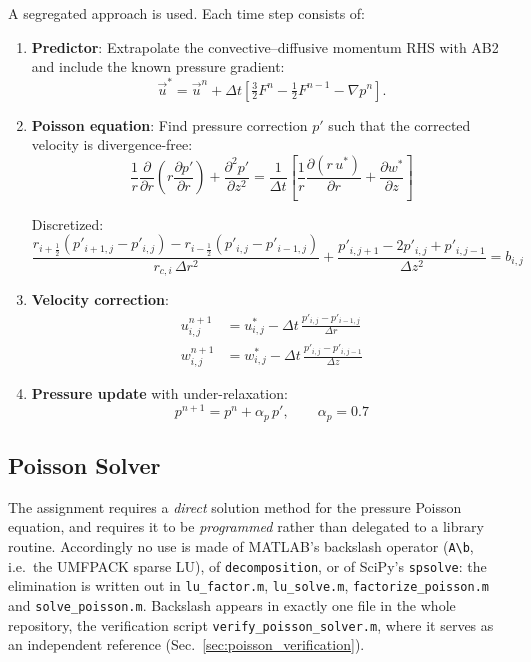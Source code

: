 \documentclass[12pt,a4paper]{article}
\newcommand{\parder}[2]{\frac{\partial #1}{\partial #2}}
\newcommand{\pparder}[2]{\frac{\partial^2 #1}{\partial {#2}^2}}
\begin{document}
A segregated approach is used. Each time step consists of:

\begin{enumerate}
    \item \textbf{Predictor}: Extrapolate the convective--diffusive momentum
    RHS with AB2 and include the known pressure gradient:
    \begin{equation}
        \vec{u}^{*}=\vec{u}^{n}+\Delta t\left[
        \tfrac{3}{2}F^n-\tfrac{1}{2}F^{n-1}-\nabla p^n\right].
    \end{equation}

    \item \textbf{Poisson equation}: Find pressure correction $p'$ such that the corrected velocity is divergence-free:
    \begin{equation}
        \frac{1}{r}\parder{}{r}\!\left(r\parder{p'}{r}\right) + \pparder{p'}{z}
        = \frac{1}{\Delta t}\left[\frac{1}{r}\parder{(r\,u^*)}{r} + \parder{w^*}{z}\right]
        \label{eq:poisson}
    \end{equation}

    Discretized:
    \begin{equation}
        \frac{r_{i+\frac{1}{2}}(p'_{i+1,j}-p'_{i,j}) - r_{i-\frac{1}{2}}(p'_{i,j}-p'_{i-1,j})}{r_{c,i}\,\Delta r^2}
        + \frac{p'_{i,j+1} - 2p'_{i,j} + p'_{i,j-1}}{\Delta z^2}
        = b_{i,j}
    \end{equation}

    \item \textbf{Velocity correction}:
    \begin{align}
        u^{n+1}_{i,j} &= u^*_{i,j} - \Delta t\,\frac{p'_{i,j} - p'_{i-1,j}}{\Delta r} \\
        w^{n+1}_{i,j} &= w^*_{i,j} - \Delta t\,\frac{p'_{i,j} - p'_{i,j-1}}{\Delta z}
    \end{align}

    \item \textbf{Pressure update} with under-relaxation:
    \begin{equation}
        p^{n+1} = p^n + \alpha_p\,p', \qquad \alpha_p = 0.7
    \end{equation}
\end{enumerate}

\subsection{Poisson Solver}
\label{sec:poisson_solver}

The assignment requires a \emph{direct} solution method for the pressure Poisson equation, and requires it to be \emph{programmed} rather than delegated to a library routine.
Accordingly no use is made of MATLAB's backslash operator (\texttt{A\textbackslash b}, i.e.\ the UMFPACK sparse LU), of \texttt{decomposition}, or of SciPy's \texttt{spsolve}: the elimination is written out in \texttt{lu\_factor.m}, \texttt{lu\_solve.m}, \texttt{factorize\_poisson.m} and \texttt{solve\_poisson.m}.
Backslash appears in exactly one file in the whole repository, the verification script \texttt{verify\_poisson\_solver.m}, where it serves as an independent reference (Sec.~\ref{sec:poisson_verification}).
\end{document}
